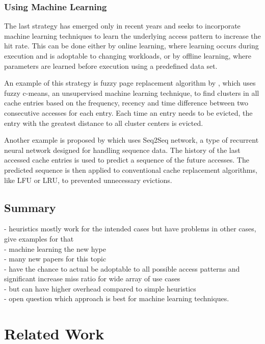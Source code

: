 \documentclass[
	12pt,
	a4paper,
	abstract,
	bibliography=totoc,
	chapterprefix,
	headings=openright,
	numbers=endperiod,
	parskip=half,
	twoside,
]{scrreprt}
\begin{document}
\subsection{Using Machine Learning}

The last strategy has emerged only in recent years and seeks to incorporate machine learning techniques to learn the underlying access pattern to increase the hit rate.
This can be done either by online learning, where learning occurs during execution and is adoptable to changing workloads, or by offline learning, where parameters are learned before execution using a predefined data set.

An example of this strategy is fuzzy page replacement algorithm by \cite{akbari2020page}, which uses
fuzzy c-means, an unsupervised machine learning technique, to find clusters in all cache entries based on the frequency, recency and time difference between two consecutive accesses for each entry.
Each time an entry needs to be evicted, the entry with the greatest distance to all cluster centers is evicted.

Another example is proposed by \cite{choi2022learning} which uses Seq2Seq network, a type of recurrent neural network designed for handling sequence data.
The history of the last accessed cache entries is used to predict a sequence of the future accesses.
The predicted sequence is then applied to conventional cache replacement algorithms, like LFU or LRU, to prevented unnecessary evictions. 


\section{Summary}

- heuristics mostly work for the intended cases but have problems in other cases, give examples for that\\
- machine learning the new hype\\
- many new papers for this topic \\
- have the chance to actual be adoptable to all possible access patterns and significant increase miss ratio for wide array of use cases \\
- but can have higher overhead compared to simple heuristics\\
- open question which approach is best for machine learning techniques.

\chapter{Related Work}
\label{cha:related work}
\end{document}
